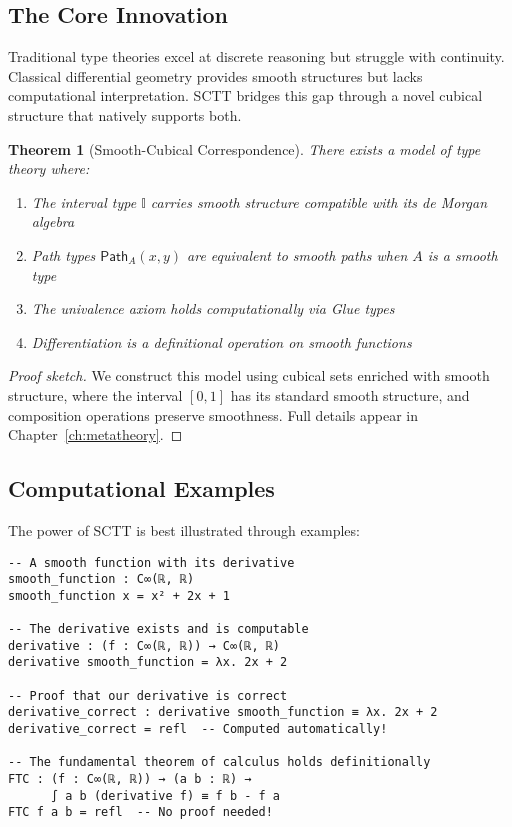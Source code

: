 \documentclass[12pt,openright,twoside]{book}
\theoremstyle{plain}
\newtheorem{theorem}{Theorem}[chapter]
\theoremstyle{definition}
\theoremstyle{remark}
\newcommand{\Path}[3]{\mathsf{Path}_{#1}(#2,#3)}
\newcommand{\I}{\mathbb{I}}
\begin{document}
\subsection{The Core Innovation}

Traditional type theories excel at discrete reasoning but struggle with continuity. Classical differential geometry provides smooth structures but lacks computational interpretation. SCTT bridges this gap through a novel cubical structure that natively supports both.

\begin{theorem}[Smooth-Cubical Correspondence]
\label{thm:smooth-cubical}
There exists a model of type theory where:
\begin{enumerate}
\item The interval type $\I$ carries smooth structure compatible with its de Morgan algebra
\item Path types $\Path{A}{x}{y}$ are equivalent to smooth paths when $A$ is a smooth type
\item The univalence axiom holds computationally via Glue types
\item Differentiation is a definitional operation on smooth functions
\end{enumerate}
\end{theorem}

\begin{proof}[Proof sketch]
We construct this model using cubical sets enriched with smooth structure, where the interval $[0,1]$ has its standard smooth structure, and composition operations preserve smoothness. Full details appear in Chapter~\ref{ch:metatheory}.
\end{proof}

\subsection{Computational Examples}

The power of SCTT is best illustrated through examples:

\begin{lstlisting}[caption={A smooth function with its derivative as a proof},label={lst:derivative}]
-- A smooth function with its derivative
smooth_function : C∞(ℝ, ℝ)
smooth_function x = x² + 2x + 1

-- The derivative exists and is computable
derivative : (f : C∞(ℝ, ℝ)) → C∞(ℝ, ℝ)
derivative smooth_function = λx. 2x + 2

-- Proof that our derivative is correct
derivative_correct : derivative smooth_function ≡ λx. 2x + 2
derivative_correct = refl  -- Computed automatically!

-- The fundamental theorem of calculus holds definitionally
FTC : (f : C∞(ℝ, ℝ)) → (a b : ℝ) → 
      ∫ a b (derivative f) ≡ f b - f a
FTC f a b = refl  -- No proof needed!
\end{lstlisting}
\end{document}
